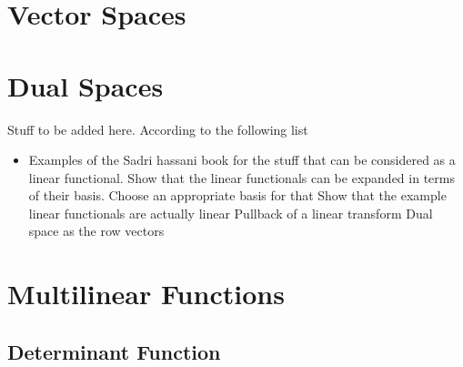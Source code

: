 \section{Vector Spaces}

\section{Dual Spaces}



Stuff to be added here. According to the following list

\begin{itemize}
	\item Examples of the Sadri hassani book for the stuff that can be considered as a linear functional. 
	\subitem Show that the linear functionals can be expanded in terms of their basis. Choose an appropriate basis for that
	\subitem Show that the example linear functionals are actually linear 
	\subitem Pullback of a linear transform
	\subitem Dual space as the row vectors
\end{itemize}


\section{Multilinear Functions}

\subsection {Determinant Function}